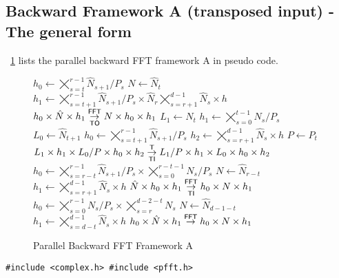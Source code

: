 \subsection{Backward Framework A (transposed input) - The general form}
\figurename{}~\ref{fig:fft_back_A} lists the parallel backward FFT framework A in pseudo code.
\begin{figure}[ht]
  \begin{algorithmic}[1]
      \State $h_0 \gets \bigtimes_{s=t}^{r-1}\hat N_{s+1}/P_s$
      \State $N   \gets \hat N_t$
      \State $h_1 \gets \bigtimes_{s=t+1}^{r-1} \hat N_{s+1} / P_{s} \times \hat N_{r}  \bigtimes_{s=r+1}^{d-1} \hat N_s \times h$
      \State $h_0 \times \hat N \times h_1 \overset{\textsf{FFT}}{\underset{\textsf{TO}}{\rightarrow}} N \times h_0 \times h_1$
      \State
      \State $L_1 \gets N_t$
      \State $h_1 \gets \bigtimes_{s=0}^{t-1} N_{s}/P_{s}$
      \State $L_0 \gets \hat N_{t+1}$
      \State $h_0 \gets \bigtimes_{s=t+1}^{r-1}\hat N_{s+1}/P_{s}$
      \State $h_2 \gets \bigtimes_{s=r+1}^{d-1} \hat N_s \times h$
      \State $P   \gets P_{t}$
      \State $L_1 \times h_1 \times L_0/P \times h_0 \times h_2\overset{\textsf{T}}{\underset{\textsf{TI}}{\rightarrow}} L_1/P \times h_1 \times L_0 \times h_0 \times h_2$
    \EndFor
    \State $h_0 \gets \bigtimes_{s=r-t}^{r-1} \hat N_{s+1}/P_s \times \bigtimes_{s=0}^{r-t-1} N_s/P_s$
    \State $N   \gets \hat N_{r-t}$
    \State $h_1 \gets \bigtimes_{s=r+1}^{d-1} \hat N_s \times h$
    \State $\hat N \times h_0 \times h_1 \overset{\textsf{FFT}}{\underset{\textsf{TI}}{\rightarrow}} h_0 \times N \times h_1 $
      \State $h_0 \gets \bigtimes_{s=0}^{r-1} N_s/P_s \times \bigtimes_{s=r}^{d-2-t} N_s$
      \State $N   \gets \hat N_{d-1-t}$
      \State $h_1 \gets \bigtimes_{s=d-t}^{d-1} \hat N_s \times h$
      \State $h_0 \times \hat N \times h_1 \overset{\textsf{FFT}}{\rightarrow} h_0 \times N \times h_1$
    \EndFor
  \end{algorithmic}
  \caption{Parallel Backward FFT Framework A}\label{fig:fft_back_A}
\end{figure}


\begin{compactitem}
  \item[\mybox] \verb+#include <complex.h> #include <pfft.h>+
\end{compactitem}



